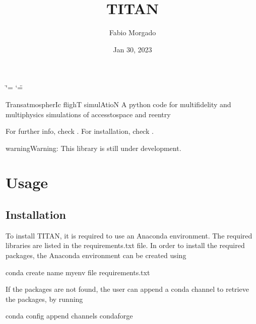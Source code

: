 \documentclass[letterpaper,10pt,english]{sphinxmanual}
\title{TITAN}
\date{Jan 30, 2023}
\author{Fabio Morgado}
\begin{document}
\ifdefined\shorthandoff
  \ifnum\catcode`\=\string=\active\shorthandoff{=}\fi
  \ifnum\catcode`\"=\active{}\fi
\fi

\pagestyle{empty}
\sphinxmaketitle
\pagestyle{plain}
\sphinxtableofcontents
\pagestyle{normal}
\label{\detokenize{index::doc}}


\sphinxAtStartPar
TransatmospherIc flighT simulAtioN \sphinxhyphen{} A python code for multi\sphinxhyphen{}fidelity and multi\sphinxhyphen{}physics simulations of access\sphinxhyphen{}to\sphinxhyphen{}space and re\sphinxhyphen{}entry

\sphinxAtStartPar
For further info, check {\hyperref[\detokenize{usage::doc}]{}}. For installation, check {\hyperref[\detokenize{usage:installation}]{}}.

\begin{sphinxadmonition}{warning}{Warning:}
\sphinxAtStartPar
This library is still under development.
\end{sphinxadmonition}

\sphinxstepscope


\chapter{Usage}
\label{\detokenize{usage:usage}}\label{\detokenize{usage::doc}}

\section{Installation}
\label{\detokenize{usage:installation}}
\sphinxAtStartPar
To install TITAN, it is required to use an Anaconda environment. The required libraries are listed in the requirements.txt file.
In order to install the required packages, the Anaconda environment can be created using

\begin{sphinxVerbatim}[commandchars=\\\{\}]
conda create \PYGZhy{}\PYGZhy{}name myenv \PYGZhy{}\PYGZhy{}file requirements.txt
\end{sphinxVerbatim}

\sphinxAtStartPar
If the packages are not found, the user can append a conda channel to retrieve the packages, by running

\begin{sphinxVerbatim}[commandchars=\\\{\}]
conda config \PYGZhy{}\PYGZhy{}append channels conda\PYGZhy{}forge
\end{sphinxVerbatim}
\end{document}
